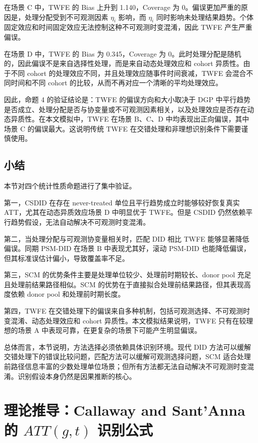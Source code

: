 \documentclass[
  fontset=windows]{ctexart}
\begin{document}
在场景 C 中，TWFE 的 Bias 上升到 1.140，Coverage 为
0。偏误更加严重的原因是，处理分配受到不可观测因素 \(\eta_i\) 影响，而
\(\eta_i\)
同时影响未处理结果趋势。个体固定效应和时间固定效应无法控制这种不可观测时变混淆，因此
TWFE 产生严重偏误。

在场景 D 中，TWFE 的 Bias 为 0.345，Coverage 为
0。此时处理分配是随机的，因此偏误不是来自选择性处理，而是来自动态处理效应和
cohort 异质性。由于不同 cohort
的处理效应不同，并且处理效应随事件时间衰减，TWFE 会混合不同时间和不同
cohort 的比较，从而不再对应一个清晰的平均处理效应。

因此，命题 4 的验证结论是：TWFE 的偏误方向和大小取决于 DGP
中平行趋势是否成立、处理分配是否与协变量或不可观测因素相关，以及处理效应是否存在动态异质性。在本文模拟中，TWFE
在场景 B、C、D 中均表现出正向偏误，其中场景 C 的偏误最大。这说明传统
TWFE 在交错处理和非理想识别条件下需要谨慎使用。

\subsection{小结}\label{ux5c0fux7ed3-1}

本节对四个统计性质命题进行了集中验证。

第一，CSDID 在存在 never-treated 单位且平行趋势成立时能够较好恢复真实
ATT，尤其在动态异质效应场景 D 中明显优于 TWFE。但是 CSDID
仍然依赖平行趋势假设，无法自动解决不可观测时变混淆。

第二，当处理分配与可观测协变量相关时，匹配 DID 相比 TWFE
能够显著降低偏误。同期 PSM-DID 在场景 B 中表现尤其好，滚动 PSM-DID
也能降低偏误，但其标准误估计偏小，导致覆盖率不足。

第三，SCM 的优势条件主要是处理单位较少、处理前时期较长、donor pool
充足且处理前结果路径相似。SCM
的优势在于直接拟合处理前结果路径，但其表现高度依赖 donor pool
和处理前时期长度。

第四，TWFE
在交错处理下的偏误来自多种机制，包括可观测选择、不可观测时变混淆、动态处理效应和
cohort 异质性。本文模拟结果说明，TWFE 只有在较理想的场景 A
中表现可靠，在更复杂的场景下可能产生明显偏误。

总体而言，本节说明，方法选择必须依赖具体识别环境。现代 DID
方法可以缓解交错处理下的错误比较问题，匹配方法可以缓解可观测选择问题，SCM
适合处理前路径信息丰富的少数处理单位场景；但所有方法都无法自动解决不可观测时变混淆。识别假设本身仍然是因果推断的核心。

\section{\texorpdfstring{理论推导：Callaway and Sant'Anna 的
\(ATT(g,t)\)
识别公式}{理论推导：Callaway and Sant'Anna 的 ATT(g,t) 识别公式}}\label{ux7406ux8bbaux63a8ux5bfccallaway-and-santanna-ux7684-attgt-ux8bc6ux522bux516cux5f0f}
\end{document}
